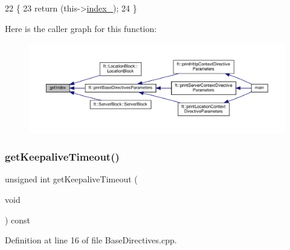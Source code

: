 \begin{DoxyCode}
22     \{
23         \textcolor{keywordflow}{return} (this->\hyperlink{classft_1_1_base_directives_a6ba30626837f300201cd32c35d50aa49}{index\_});
24     \}
\end{DoxyCode}
Here is the caller graph for this function\+:
\nopagebreak
\begin{figure}[H]
\begin{center}
\leavevmode
\includegraphics[width=350pt]{classft_1_1_base_directives_a018f34a5ffd66e891494b5c0ee69177b_icgraph}
\end{center}
\end{figure}
\mbox{\label{classft_1_1_base_directives_ab8574338758f65325cab5d1c394826c8}} 
\subsubsection{\texorpdfstring{get\+Keepalive\+Timeout()}{getKeepaliveTimeout()}}
{\footnotesize\ttfamily unsigned int get\+Keepalive\+Timeout (\begin{DoxyParamCaption}\item[{void}]{ }\end{DoxyParamCaption}) const}



Definition at line 16 of file Base\+Directives.\+cpp.


